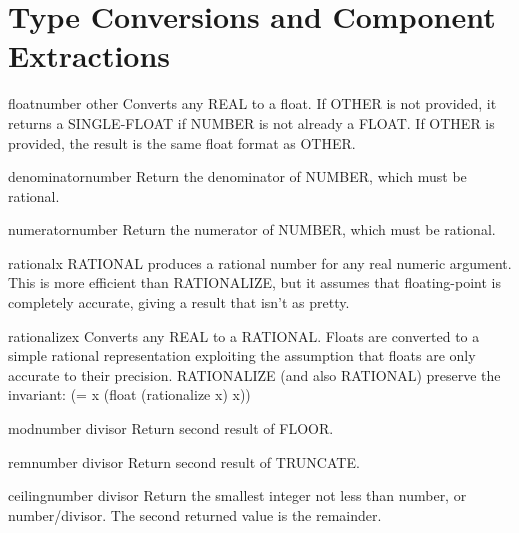 \documentclass[10pt,english]{book}
\begin{document}
\section{Type Conversions and Component Extractions}
\label{sec:type-conv-comp}

\begin{function}{float}{number \op other}
  Converts any REAL to a float. If OTHER is not provided, it returns a
  SINGLE-FLOAT if NUMBER is not already a FLOAT. If OTHER is provided, the
  result is the same float format as OTHER.
\end{function}

\begin{function}{denominator}{number}
  Return the denominator of NUMBER, which must be rational.
\end{function}

\begin{function}{numerator}{number}
  Return the numerator of NUMBER, which must be rational.
\end{function}

\begin{function}{rational}{x}
  RATIONAL produces a rational number for any real numeric argument. This is
  more efficient than RATIONALIZE, but it assumes that floating-point is
  completely accurate, giving a result that isn't as pretty.
\end{function}

\begin{function}{rationalize}{x}
  Converts any REAL to a RATIONAL.  Floats are converted to a simple rational
  representation exploiting the assumption that floats are only accurate to
  their precision.  RATIONALIZE (and also RATIONAL) preserve the invariant:
      (= x (float (rationalize x) x))
\end{function}

\begin{function}{mod}{number divisor}
  Return second result of FLOOR.
\end{function}

\begin{function}{rem}{number divisor}
  Return second result of TRUNCATE.
\end{function}

\begin{function}{ceiling}{number \op divisor}
  Return the smallest integer not less than number, or number/divisor.
  The second returned value is the remainder.
\end{function}
\end{document}
